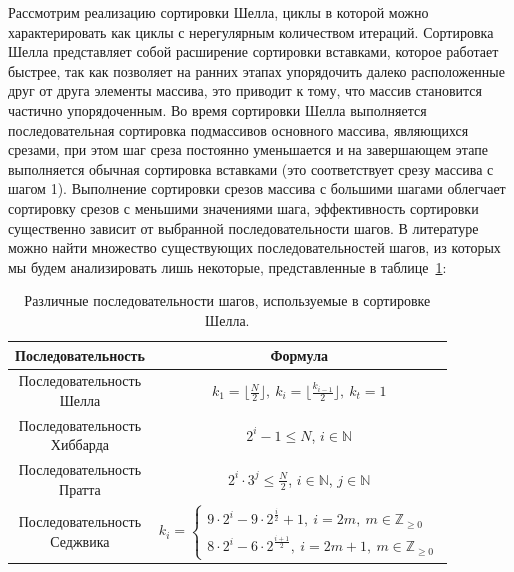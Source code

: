 Рассмотрим реализацию сортировки Шелла, циклы в которой можно характерировать как циклы с нерегулярным количеством итераций.
Сортировка Шелла представляет собой расширение сортировки вставками, которое работает быстрее, так как позволяет на ранних этапах упорядочить далеко расположенные друг от друга элементы массива, это приводит к тому, что массив становится частично упорядоченным.
Во время сортировки Шелла выполняется последовательная сортировка подмассивов основного массива, являющихся срезами, при этом шаг среза постоянно уменьшается и на завершающем этапе выполняется обычная сортировка вставками (это соответствует срезу массива с шагом 1).
Выполнение сортировки срезов массива с большими шагами облегчает сортировку срезов с меньшими значениями шага, эффективность сортировки существенно зависит от выбранной последовательности шагов.
В литературе можно найти множество существующих последовательностей шагов, из которых мы будем анализировать лишь некоторые, представленные в таблице~\ref{tbl:text_4_vec_irreg_steps}:

\begin{table}
\centering
\singlespacing
{}\caption{Различные последовательности шагов, используемые в сортировке Шелла.}
\bigskip
\label{tbl:text_4_vec_irreg_steps}
\begin{tabular}{ | c | c | }
  \hline
  Последовательность & Формула \\ \hline\hline
  \makecell{Последовательность \\ Шелла}    & $k_1 = \lfloor \frac{N}{2} \rfloor, \ k_i = \lfloor \frac{k_{i-1}}{2} \rfloor, \ k_t = 1$ \\ \hline
  \makecell{Последовательность \\ Хиббарда} & $2^i - 1 \le N$, $i \in \mathbb{N}$ \\ \hline
  \makecell{Последовательность \\ Пратта}   & $2^i \cdot 3^j \le \frac{N}{2}$, $i \in \mathbb{N}$, $j \in \mathbb{N}$ \\ \hline
  \makecell{Последовательность \\ Седжвика} & $k_i = \begin{cases} 9 \cdot 2^i - 9 \cdot 2^{\frac{i}{2}} + 1, \ i = 2m, \ m \in \mathbb{Z}_{\ge 0} \\ 8 \cdot 2^i - 6 \cdot 2^{\frac{i + 1}{2}}, \ i = 2m + 1, \ m \in \mathbb{Z}_{\ge 0} \end{cases}$ \\ \hline
\end{tabular}
\end{table}

